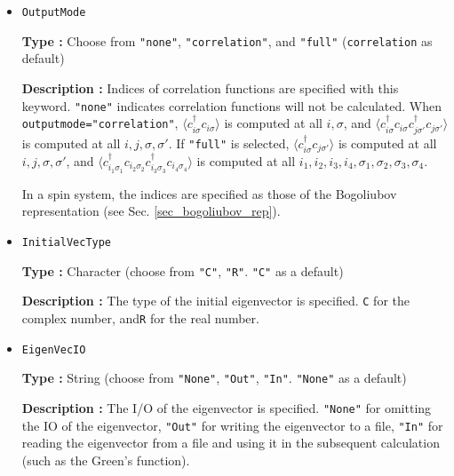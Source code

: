 \begin{itemize}
{\bf Type :} Positive integer (default value: \verb|20|)

{\bf Description :} (Only for TPQ) 
The interval of calculating correlation functions in the TPQ iteration is specified.\\ 
{\bf Note:} A small interval increases the time cost of calculations.

\item \verb|OutputMode|

{\bf Type :} Choose from \verb|"none"|, \verb|"correlation"|, and \verb|"full"|
(\verb|correlation| as default)

{\bf Description :} Indices of correlation functions
are specified with this keyword.
\verb|"none"| indicates correlation functions will not be calculated.
When \verb|outputmode="correlation"|,
$\langle c_{i \sigma}^{\dagger}c_{i \sigma} \rangle$ is computed at all $i, \sigma$,
and
$\langle c_{i \sigma}^{\dagger}c_{i \sigma} c_{j \sigma'}^{\dagger}c_{j \sigma'} \rangle$
is computed at all $i, j, \sigma, \sigma'$.
If \verb|"full"| is selected,
$\langle c_{i \sigma}^{\dagger}c_{j \sigma'} \rangle$ is computed at all $i, j, \sigma, \sigma'$,
and
$\langle c_{i_1 \sigma_1}^{\dagger}c_{i_2 \sigma_2} c_{i_3 \sigma_3}^{\dagger}c_{i_4 \sigma_4} \rangle$
is computed at all $i_1, i_2, i_3, i_4, \sigma_1, \sigma_2, \sigma_3, \sigma_4$.

In a spin system, 
the indices are specified as those of the Bogoliubov representation
(see Sec. \ref{sec_bogoliubov_rep}).

\item \verb|InitialVecType|

  {\bf Type :} Character (choose from \verb|"C"|, \verb|"R"|.
  \verb|"C"| as a default)

  {\bf Description :} The type of the initial eigenvector is specified.
  \verb|C| for the complex number, and\verb|R| for the real number.

\item \verb|EigenVecIO|
  
  {\bf Type :} String (choose from \verb|"None"|, \verb|"Out"|, \verb|"In"|.
  \verb|"None"| as a default)

  {\bf Description :} The I/O of the eigenvector is specified.
  \verb|"None"| for omitting the IO of the eigenvector,
  \verb|"Out"| for writing the eigenvector to a file,
  \verb|"In"| for reading the eigenvector from a file and
  using it in the subsequent calculation (such as the Green's function).

\end{itemize}

